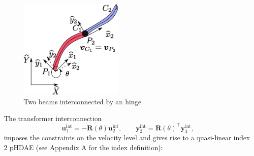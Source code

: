 \documentclass{svjour3}                     %
\begin{document}
	\begin{figure}[t]
		\centering
		\includegraphics[width=0.45\textwidth]{beam_int.eps} 
		
		\caption{Two beams interconnected by an hinge }
		\label{fig:beam_int}
	\end{figure}
	
	The transformer interconnection
	\begin{equation}
	\label{eq:int_hinge}
	\mathbf{u}_1^{\text{int}} = -\mathbf{R}(\theta) \mathbf{u}_2^{\text{int}}, \qquad
	\mathbf{y}_2^{\text{int}} = \mathbf{R}(\theta)^\top \mathbf{y}_1^{\text{int}},
	\end{equation}
	imposes the constraints on the velocity level and gives rise to a quasi-linear index 2 pHDAE (see Appendix A for the index definition):
	
\end{document}
